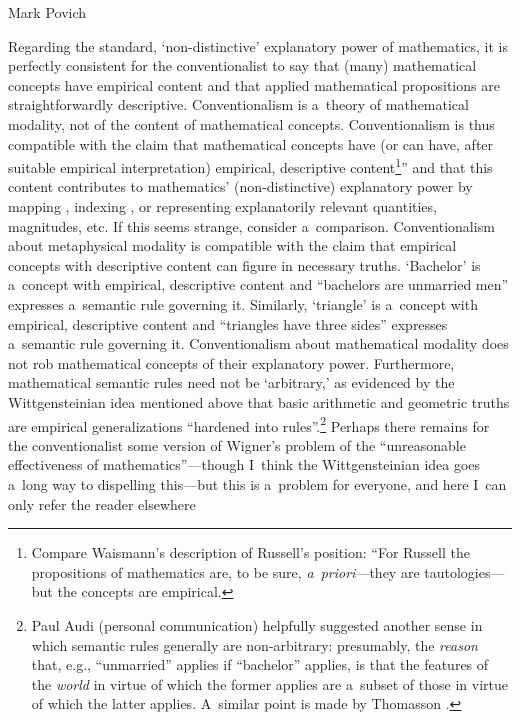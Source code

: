 \begin{artengenv}{Mark Povich}
{Regarding the standard, ‘non-distinctive' explanatory power of mathematics, it is perfectly consistent for the conventionalist to say that (many) mathematical concepts have empirical content and that applied mathematical propositions are straightforwardly descriptive. Conventionalism is a~theory of mathematical modality, not of the content of mathematical concepts. Conventionalism is thus compatible with the claim that mathematical concepts have (or can have, after suitable empirical interpretation) empirical, descriptive content\footnote{Compare Waismann's
\parencite*[][p.66]{shanker_nature_1986} %
 description of Russell's position: ``For Russell the propositions of mathematics are, to be sure, \textit{a~priori}---they are tautologies---but the concepts are empirical.}'' and that this content contributes to mathematics' (non-distinctive) explanatory power by mapping 
\parencites[][]{pincock_mathematics_2011}[][]{bueno_applying_2018}, %
 indexing 
\parencite[][]{melia_weaseling_2000}, %
 or representing 
\parencite[][]{saatsi_enhanced_2011} %
 explanatorily relevant quantities, magnitudes, etc. If this seems strange, consider a~comparison. Conventionalism about metaphysical modality is compatible with the claim that empirical concepts with descriptive content can figure in necessary truths. ‘Bachelor' is a~concept with empirical, descriptive content and ``bachelors are unmarried men'' expresses a~semantic rule governing it. Similarly, ‘triangle' is a~concept with empirical, descriptive content and ``triangles have three sides'' expresses a~semantic rule governing it. Conventionalism about mathematical modality does not rob mathematical concepts of their explanatory power. Furthermore, mathematical semantic rules need not be ‘arbitrary,' as evidenced by the Wittgensteinian idea mentioned above that basic arithmetic and geometric truths are empirical generalizations ``hardened into rules''.\footnote{Paul Audi (personal communication) helpfully suggested another sense in which semantic rules generally are non-arbitrary: presumably, the \textit{reason} that, e.g., ``unmarried'' applies if ``bachelor'' applies, is that the features of the \textit{world} in virtue of which the former applies are a~subset of those in virtue of which the latter applies. A~similar point is made by Thomasson 
\parencite*[][p.70]{thomasson_ordinary_2007}.%
} Perhaps there remains for the conventionalist some version of Wigner's 
\parencite*[][]{wigner_unreasonable_1960} %
 problem of the ``unreasonable effectiveness of mathematics''---though I~think the Wittgensteinian idea goes a~long way to dispelling this---but this is a~problem for everyone, and here I~can only refer the reader elsewhere 


}
\end{artengenv}
